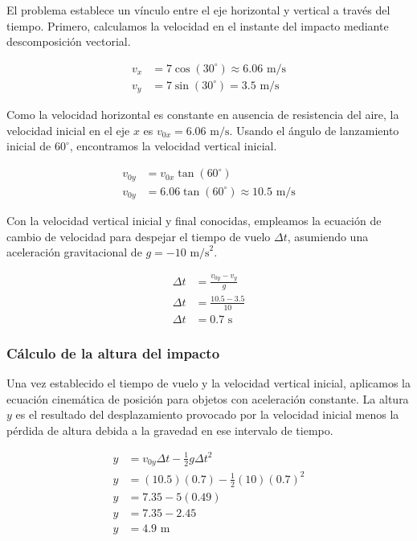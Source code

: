 \documentclass[12pt, a4paper]{article}
\begin{document}
El problema establece un vínculo entre el eje horizontal y vertical a través del tiempo. Primero, calculamos la velocidad en el instante del impacto mediante descomposición vectorial.

\begin{align*}
v_x &= 7 \cos(30^{\circ}) \approx 6.06 \text{ m/s} \\
v_y &= 7 \sin(30^{\circ}) = 3.5 \text{ m/s}
\end{align*}

Como la velocidad horizontal es constante en ausencia de resistencia del aire, la velocidad inicial en el eje $x$ es $v_{0x} = 6.06 \text{ m/s}$. Usando el ángulo de lanzamiento inicial de $60^{\circ}$, encontramos la velocidad vertical inicial.

\begin{align*}
v_{0y} &= v_{0x} \tan(60^{\circ}) \\
v_{0y} &= 6.06 \tan(60^{\circ}) \approx 10.5 \text{ m/s}
\end{align*}

Con la velocidad vertical inicial y final conocidas, empleamos la ecuación de cambio de velocidad para despejar el tiempo de vuelo $\Delta t$, asumiendo una aceleración gravitacional de $g = -10 \text{ m/s}^2$.

\begin{align*}
\Delta t &= \frac{v_{0y} - v_y}{g} \\
\Delta t &= \frac{10.5 - 3.5}{10} \\
\Delta t &= 0.7 \text{ s}
\end{align*}

\subsubsection*{Cálculo de la altura del impacto}

Una vez establecido el tiempo de vuelo y la velocidad vertical inicial, aplicamos la ecuación cinemática de posición para objetos con aceleración constante. La altura $y$ es el resultado del desplazamiento provocado por la velocidad inicial menos la pérdida de altura debida a la gravedad en ese intervalo de tiempo.

\begin{align*}
y &= v_{0y} \Delta t - \frac{1}{2} g \Delta t^2 \\
y &= (10.5)(0.7) - \frac{1}{2}(10)(0.7)^2 \\
y &= 7.35 - 5(0.49) \\
y &= 7.35 - 2.45 \\
y &= 4.9 \text{ m}
\end{align*}
\end{document}
